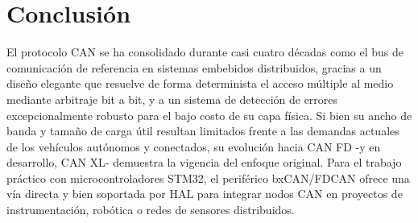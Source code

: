 \documentclass[pdflatex,sn-mathphys-num]{sn-jnl}%
\begin{document}
\section{Conclusión}\label{sec:conclusion}
El protocolo CAN se ha consolidado durante casi cuatro décadas como el bus de comunicación de referencia en sistemas embebidos distribuidos, gracias a un diseño elegante que resuelve de forma determinista el acceso múltiple al medio mediante arbitraje bit a bit, y a un sistema de detección de errores excepcionalmente robusto para el bajo costo de su capa física. Si bien su ancho de banda y tamaño de carga útil resultan limitados frente a las demandas actuales de los vehículos autónomos y conectados, su evolución hacia CAN FD -y en desarrollo, CAN XL- demuestra la vigencia del enfoque original. Para el trabajo práctico con microcontroladores STM32, el periférico bxCAN/FDCAN ofrece una vía directa y bien soportada por HAL para integrar nodos CAN en proyectos de instrumentación, robótica o redes de sensores distribuidos.
\end{document}
